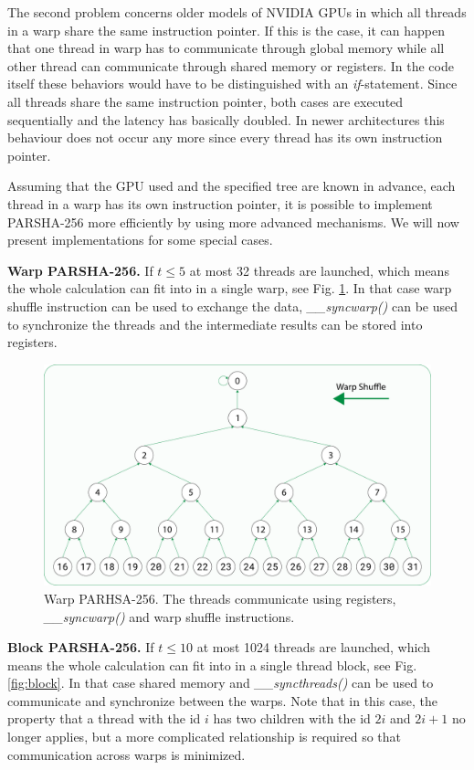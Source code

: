 \documentclass[letterpaper]{article}
\newcommand{\mypar}[1]{{\bf #1.}}
\begin{document}
The second problem concerns older models of NVIDIA GPUs in which all threads in a warp share the same instruction pointer. If this is the case, it can happen that one thread in warp has to communicate through global memory while all other thread can communicate through shared memory or registers.
In the code itself these behaviors would have to be distinguished with an \emph{if}-statement. Since all threads share the same instruction pointer, both cases are executed sequentially and the latency has basically doubled. In newer architectures this behaviour does not occur any more since every thread has its own instruction pointer.

Assuming that the GPU used and the specified tree are known in advance, each thread in a warp has its own instruction pointer, it is possible to implement PARSHA-256 more efficiently by using more advanced mechanisms. We will now present implementations for some special cases.

\mypar{Warp PARSHA-256} If $t \leq 5$ at most 32 threads are launched, which means the whole calculation can fit into in a single warp, see Fig. \ref{fig:warp}. In that case warp shuffle instruction can be used to exchange the data, \emph{\_\_syncwarp()} can be used to synchronize the threads and the intermediate results can be stored into registers.

\begin{figure}[t]\centering
\includegraphics[scale=0.15]{warp2.pdf}
  \caption{Warp PARHSA-256. The threads communicate using registers, \emph{\_\_syncwarp()} and warp shuffle instructions. \label{fig:warp}}
\end{figure}


\mypar{Block PARSHA-256} If $t \leq 10$ at most 1024 threads are launched, which means the whole calculation can fit into in a single thread block, see Fig. \ref{fig:block}. In that case shared memory and \emph{\_\_syncthreads()} can be used to communicate and synchronize between the warps. Note that in this case, the property that a thread with the id $i$ has two children with the id $2i$ and $2i+1$ no longer applies, but a more complicated relationship is required so that communication across warps is minimized.
\end{document}
